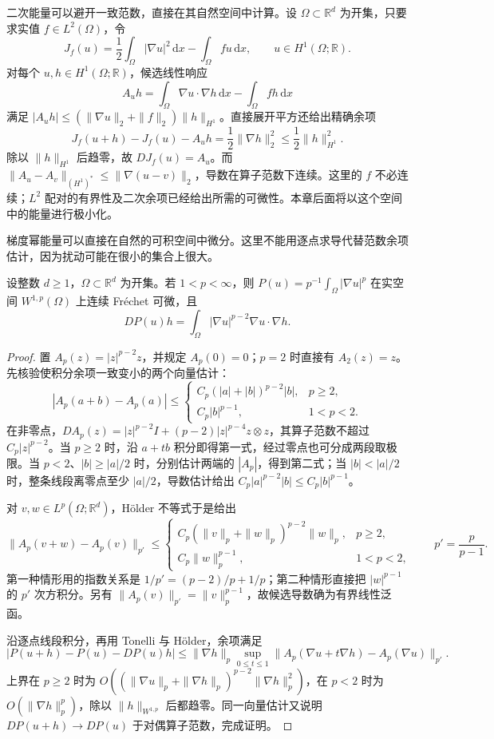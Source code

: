 二次能量可以避开一致范数，直接在其自然空间中计算。设 \(\Omega\subset\mathbb R^d\) 为开集，只要求实值 \(f\in L^2(\Omega)\)，令
\[
 J_f(u)=\frac12\int_\Omega|\nabla u|^2\,\mathrm{d}x
          -\int_\Omega fu\,\mathrm{d}x,
 \qquad u\in H^1(\Omega;\mathbb R).
\]
对每个 \(u,h\in H^1(\Omega;\mathbb R)\)，候选线性响应
\[
 A_uh=\int_\Omega\nabla u\cdot\nabla h\,\mathrm{d}x
             -\int_\Omega fh\,\mathrm{d}x
\]
满足 \(|A_uh|\leq(\|\nabla u\|_2+\|f\|_2)\|h\|_{H^1}\)。直接展开平方还给出精确余项
\[
 J_f(u+h)-J_f(u)-A_uh=\frac12\|\nabla h\|_2^2
                       \leq\frac12\|h\|_{H^1}^2.
\]
除以 \(\|h\|_{H^1}\) 后趋零，故 \(DJ_f(u)=A_u\)。而 \(\|A_u-A_v\|_{(H^1)^*}\leq\|\nabla(u-v)\|_2\)，导数在算子范数下连续。这里的 \(f\) 不必连续；\(L^2\) 配对的有界性及二次余项已经给出所需的可微性。本章后面将以这个空间中的能量进行极小化。

梯度幂能量可以直接在自然的可积空间中微分。这里不能用逐点求导代替范数余项估计，因为扰动可能在很小的集合上很大。

\begin{proposition}[梯度幂能量的连续微分]
\label{b2:prop:14-power-frechet}
设整数 \(d\geq1\)，\(\Omega\subset\mathbb R^d\) 为开集。若 \(1<p<\infty\)，则 \(P(u)=p^{-1}\int_\Omega|\nabla u|^p\) 在实空间 \(W^{1,p}(\Omega)\) 上连续 Fréchet 可微，且
\[DP(u)h=\int_\Omega |\nabla u|^{p-2}\nabla u\cdot\nabla h.\]
\end{proposition}
\begin{proof}
置 \(A_p(z)=|z|^{p-2}z\)，并规定 \(A_p(0)=0\)；\(p=2\) 时直接有 \(A_2(z)=z\)。先核验使积分余项一致变小的两个向量估计：
\[
 |A_p(a+b)-A_p(a)|\le
 \begin{cases}
 C_p(|a|+|b|)^{p-2}|b|,&p\ge2,\\
 C_p|b|^{p-1},&1<p<2.
 \end{cases}
\]
在非零点，\(DA_p(z)=|z|^{p-2}I+(p-2)|z|^{p-4}z\otimes z\)，其算子范数不超过 \(C_p|z|^{p-2}\)。当 \(p\ge2\) 时，沿 \(a+tb\) 积分即得第一式，经过零点也可分成两段取极限。当 \(p<2\)、\(|b|\ge |a|/2\) 时，分别估计两端的 \(|A_p|\)，得到第二式；当 \(|b|<|a|/2\) 时，整条线段离零点至少 \(|a|/2\)，导数估计给出 \(C_p|a|^{p-2}|b|\le C_p|b|^{p-1}\)。

对 \(v,w\in L^p(\Omega;\mathbb R^d)\)，Hölder 不等式于是给出
\[
 \|A_p(v+w)-A_p(v)\|_{p'}\le
 \begin{cases}
 C_p(\|v\|_p+\|w\|_p)^{p-2}\|w\|_p,&p\ge2,\\
 C_p\|w\|_p^{p-1},&1<p<2,
 \end{cases}
 \qquad p'=\frac p{p-1}.
\]
第一种情形用的指数关系是 \(1/p'=(p-2)/p+1/p\)；第二种情形直接把 \(|w|^{p-1}\) 的 \(p'\) 次方积分。另有 \(\|A_p(v)\|_{p'}=\|v\|_p^{p-1}\)，故候选导数确为有界线性泛函。

沿逐点线段积分，再用 Tonelli 与 Hölder，余项满足
\[
 |P(u+h)-P(u)-DP(u)h|
 \le \|\nabla h\|_p\sup_{0\le t\le1}
 \|A_p(\nabla u+t\nabla h)-A_p(\nabla u)\|_{p'}.
\]
上界在 \(p\ge2\) 时为 \(O((\|\nabla u\|_p+\|\nabla h\|_p)^{p-2}\|\nabla h\|_p^2)\)，在 \(p<2\) 时为 \(O(\|\nabla h\|_p^p)\)，除以 \(\|h\|_{W^{1,p}}\) 后都趋零。同一向量估计又说明 \(DP(u+h)\to DP(u)\) 于对偶算子范数，完成证明。
\end{proof}

